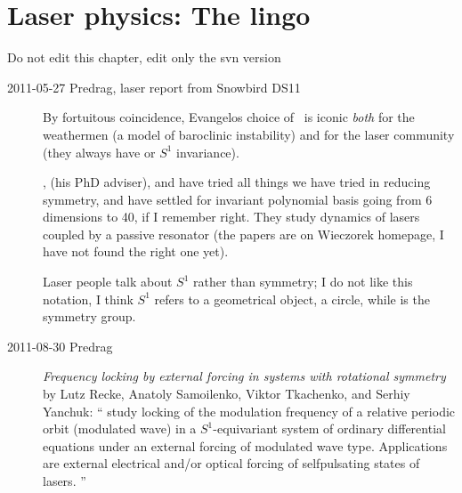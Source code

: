 
\chapter{Laser physics: The lingo}
\label{chap:lasers}

\renewcommand{\LieElrep}{\ensuremath{\mathbf{G}}} %
\renewcommand{\LieEl}{\ensuremath{\gamma}}  %
\renewcommand{\gSpace}{\ensuremath{{\bf \theta}}}   %

\bigskip\bigskip
\noindent
{\color{red} Do not edit this chapter, edit only the svn version}
\bigskip\bigskip


\begin{description}

\item[2011-05-27 Predrag, laser report from Snowbird DS11]
												\toCB
By fortuitous coincidence, Evangelos choice of \cLe\ is iconic
{\em both}  for
the weathermen (a model of baroclinic instability) and for the laser
community (they always have  or $S^1$ invariance).

,
 (his PhD adviser), and
have tried all things we have tried in reducing  symmetry, and
have settled for invariant polynomial basis going from 6 dimensions to 40,
if I remember right. They study dynamics of
lasers coupled by a passive resonator (the papers are on Wieczorek
homepage, I have not found the right one yet).

												\toCB
Laser people talk about $S^1$ rather than  symmetry;
I do not like this notation, I think $S^1$ refers to a geometrical
object, a circle, while  is the symmetry group.


\item[2011-08-30 Predrag]
{\em Frequency locking by external forcing in systems with rotational
symmetry } by Lutz Recke, Anatoly Samoilenko, Viktor Tkachenko, and
Serhiy Yanchuk: `` study locking of the modulation
frequency of a relative periodic orbit (modulated wave) in a
$S^{1}$-equivariant system of ordinary differential equations under an
external forcing of modulated wave type. Applications are external
electrical and/or optical forcing of selfpulsating states of lasers.
''


\end{description}
